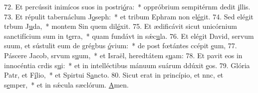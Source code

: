 72. Et percússit inimícos suos in postri\uline{ó}ra:~* oppróbrium sempitérnm dedit \uline{i}llis.
73. Et répulit tabernáclum J\uline{o}seph:~* et tribum Ephram non el\uline{é}git.
74. Sed elégit trbum J\uline{u}da,~* montem Sin quem dil\uline{é}xit.
75. Et ædificávit sicut unicórnium sanctifícium sum in t\uline{e}rra,~* quam fundávt in sǽc\uline{u}la.
76. Et elégit David, servum suum, et sústulit eum de grégbus \uline{ó}vium:~* de post fœtántes ccépit \uline{e}um,
77. Páscere Jacob, srvum s\uline{u}um,~* et Israël, heredtátem s\uline{u}am:
78. Et pavit eos in innocéntia crdis s\uline{u}i:~* et in intelléctibus mánuum suárum ddúxit \uline{e}os.
79. Glória Patr, et F\uline{í}lio,~* et Spirtui S\uline{a}ncto.
80. Sicut erat in princípio, et nnc, et s\uline{e}mper,~* et in sǽcula sæclórum. \uline{A}men.
